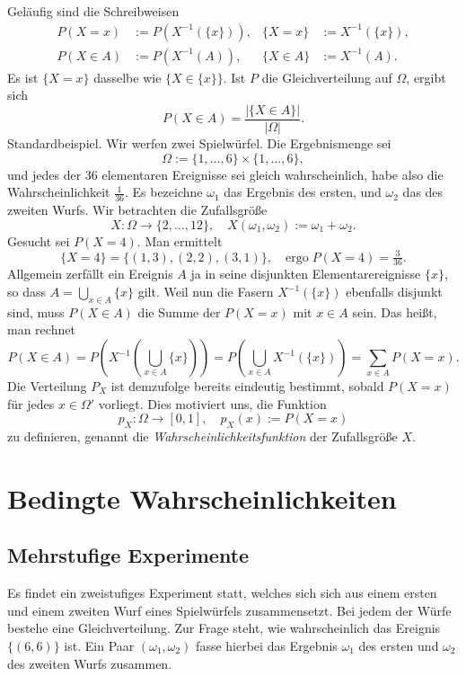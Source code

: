 Geläufig sind die Schreibweisen
\begin{align*}
P(X=x) &:= P(X^{-1}(\{x\})), & \{X=x\} &:= X^{-1}(\{x\}),\\
P(X\in A) &:= P(X^{-1}(A)), & \{X\in A\} &:= X^{-1}(A).
\end{align*}
Es ist $\{X=x\}$ dasselbe wie $\{X\in\{x\}\}$. 
Ist $P$ die Gleichverteilung auf $\Omega$, ergibt sich
\[P(X\in A) = \frac{|\{X\in A\}|}{|\Omega|}.\]
Standardbeispiel. Wir werfen zwei Spielwürfel.
Die Ergebnismenge sei%
\[\Omega := \{1,\ldots,6\}\times\{1,\ldots,6\},\]
und jedes der 36 elementaren Ereignisse sei gleich wahrscheinlich, habe
also die Wahrscheinlichkeit $\tfrac{1}{36}$.
Es bezeichne $\omega_1$ das Ergebnis des ersten, und $\omega_2$
das des zweiten Wurfs. Wir betrachten die Zufallsgröße%
\[X\colon\Omega\to\{2,\ldots,12\},\quad
X(\omega_1,\omega_2) := \omega_1+\omega_2.\]
Gesucht sei $P(X=4)$. Man ermittelt
\[\{X=4\} = \{(1,3), (2,2), (3,1)\},\quad\text{ergo}\;P(X=4) = \tfrac{3}{36}.\]
Allgemein zerfällt ein Ereignis $A$ ja in seine disjunkten Elementarereignisse
$\{x\}$, so dass $A = \bigcup_{x\in A} \{x\}$ gilt. Weil nun die
Fasern $X^{-1}(\{x\})$ ebenfalls disjunkt sind, muss $P(X\in A)$ die
Summe der $P(X=x)$ mit $x\in A$ sein. Das heißt, man rechnet%
\[P(X\in A) = P(X^{-1}(\bigcup_{x\in A} \{x\})) = P(\bigcup_{x\in A} X^{-1}(\{x\}))
= \sum_{x\in A} P(X=x).\]
Die Verteilung $P_X$ ist demzufolge bereits eindeutig bestimmt,
sobald $P(X=x)$ für jedes $x\in\Omega'$ vorliegt. Dies motiviert
uns, die Funktion
\[p_X\colon\Omega\to[0,1],\quad p_X(x) := P(X=x)\]
zu definieren, genannt die \emph{Wahrscheinlichkeitsfunktion} der
Zufallsgröße $X$.

\newpage
\section{Bedingte Wahrscheinlichkeiten}

\subsection{Mehrstufige Experimente}

Es findet ein zweistufiges Experiment statt, welches sich sich
aus einem ersten und einem zweiten Wurf eines Spielwürfels
zusammensetzt. Bei jedem der Würfe bestehe eine Gleichverteilung.
Zur Frage steht, wie wahrscheinlich das Ereignis $\{(6,6)\}$ ist.
Ein Paar $(\omega_1,\omega_2)$ fasse hierbei das Ergebnis $\omega_1$
des ersten und $\omega_2$ des zweiten Wurfs zusammen.

